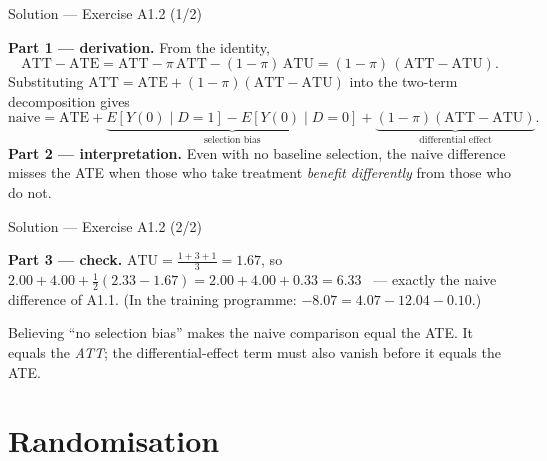 \documentclass[aspectratio=169,11pt]{beamer}
\begin{document}
\begin{frame}{Solution --- Exercise A1.2 (1/2)}
\begin{solutionbox}
  \scriptsize
  \textbf{Part 1 --- derivation.} From the identity,
  \[
    \text{ATT}-\text{ATE} = \text{ATT} - \pi\,\text{ATT} - (1-\pi)\,\text{ATU}
    = (1-\pi)\,(\text{ATT}-\text{ATU}).
  \]
  Substituting $\text{ATT} = \text{ATE} + (1-\pi)(\text{ATT}-\text{ATU})$ into the
  two-term decomposition gives
  \[
    \text{naive} = \text{ATE} + \underbrace{E[Y(0)\mid D{=}1]-E[Y(0)\mid D{=}0]}_{\text{selection bias}}
    + \underbrace{(1-\pi)(\text{ATT}-\text{ATU})}_{\text{differential effect}} .
  \]
  \textbf{Part 2 --- interpretation.} Even with no baseline selection, the naive
  difference misses the ATE when those who take treatment \emph{benefit differently}
  from those who do not.
\end{solutionbox}
\end{frame}

\begin{frame}{Solution --- Exercise A1.2 (2/2)}
\begin{solutionbox}
  \smallskip
  \textbf{Part 3 --- check.} $\text{ATU} = \tfrac{1+3+1}{3} = 1.67$, so
  $2.00 + 4.00 + \tfrac12(2.33-1.67) = 2.00 + 4.00 + 0.33 = 6.33$ \checkmark\ ---
  exactly the naive difference of A1.1. (In the training programme:
  $-8.07 = 4.07 - 12.04 - 0.10$.)
\end{solutionbox}
\begin{mistake}
  Believing ``no selection bias'' makes the naive comparison equal the ATE. It equals the
  \emph{ATT}; the differential-effect term must also vanish before it equals the ATE.
\end{mistake}
\end{frame}

\section{Randomisation}
\end{document}
